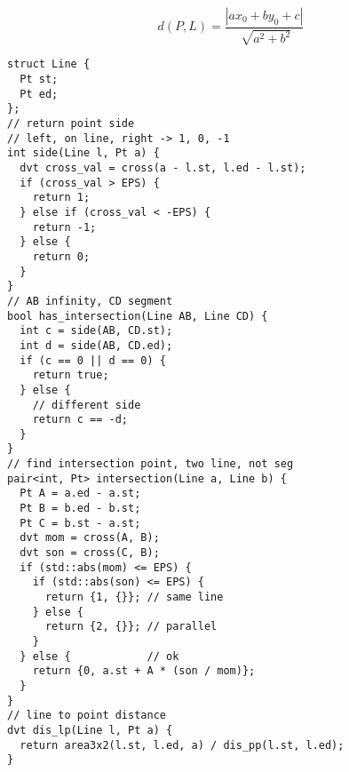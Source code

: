 \[d(P, L) = \frac{|ax_0 + by_0 + c|}{\sqrt[]{a^2 + b^2}}\]

\begin{lstlisting}
struct Line {
  Pt st;
  Pt ed;
};
// return point side
// left, on line, right -> 1, 0, -1
int side(Line l, Pt a) {
  dvt cross_val = cross(a - l.st, l.ed - l.st);
  if (cross_val > EPS) {
    return 1;
  } else if (cross_val < -EPS) {
    return -1;
  } else {
    return 0;
  }
}
// AB infinity, CD segment
bool has_intersection(Line AB, Line CD) {
  int c = side(AB, CD.st);
  int d = side(AB, CD.ed);
  if (c == 0 || d == 0) {
    return true;
  } else {
    // different side
    return c == -d;
  }
}
// find intersection point, two line, not seg
pair<int, Pt> intersection(Line a, Line b) {
  Pt A = a.ed - a.st;
  Pt B = b.ed - b.st;
  Pt C = b.st - a.st;
  dvt mom = cross(A, B);
  dvt son = cross(C, B);
  if (std::abs(mom) <= EPS) {
    if (std::abs(son) <= EPS) {
      return {1, {}}; // same line
    } else {
      return {2, {}}; // parallel
    }
  } else {            // ok
    return {0, a.st + A * (son / mom)};
  }
}
// line to point distance
dvt dis_lp(Line l, Pt a) {
  return area3x2(l.st, l.ed, a) / dis_pp(l.st, l.ed);
}
\end{lstlisting}
